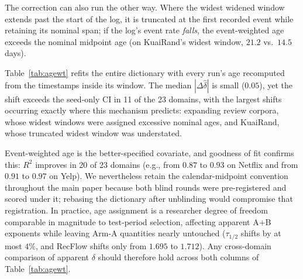 \documentclass[10pt,letterpaper]{article}
\begin{document}
The correction can also run the other way. Where the widest widened window
extends past the start of the log, it is truncated at the first recorded event while retaining
its nominal span; if the log's event rate \emph{falls}, the event-weighted age
exceeds the nominal midpoint age (on KuaiRand's widest window, $21.2$ vs.\ $14.5$ days).

Table~\ref{tab:agewt} refits the entire dictionary with every run's age
recomputed from the timestamps inside its window. The median $|\Delta\hat\delta|$ is small
($0.05$), yet the shift exceeds the seed-only CI in 11 of the 23 domains, with the
largest shifts occurring exactly where this mechanism predicts: expanding review
corpora, whose widest windows were assigned excessive nominal ages, and KuaiRand,
whose truncated widest window was understated.

Event-weighted age is the better-specified covariate, and goodness of fit confirms this:
$R^2$ improves in 20 of 23 domains (e.g., from $0.87$ to $0.93$ on Netflix and from $0.91$ to $0.97$ on
Yelp). We nevertheless retain the calendar-midpoint convention throughout
the main paper because both blind rounds were pre-registered
and scored under it; rebasing the dictionary after unblinding would
compromise that registration. In practice, age assignment
is a researcher degree of freedom comparable in magnitude to test-period selection,
affecting apparent A${+}$B exponents while leaving Arm-A quantities nearly untouched ($\tau_{1/2}$
shifts by at most $4\%$, and RecFlow shifts only from $1.695$ to $1.712$). Any cross-domain comparison of
apparent $\delta$ should therefore hold across both columns of
Table~\ref{tab:agewt}.
\end{document}
